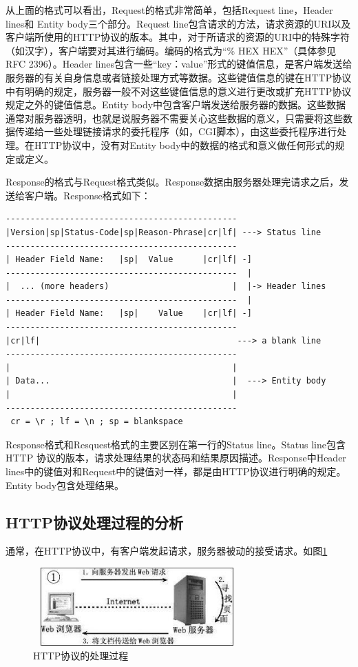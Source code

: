 \documentclass[12pt, twoside, a4paper, xetex]{report}
\begin{document}
 	从上面的格式可以看出，Request的格式非常简单，包括Request line，Header lines和 Entity body三个部分。Request line包含请求的方法，请求资源的URI以及客户端所使用的HTTP协议的版本。其中，对于所请求的资源的URI中的特殊字符（如汉字），客户端要对其进行编码。编码的格式为“\% HEX HEX”（具体参见RFC 2396）。Header lines包含一些“key：value”形式的键值信息，是客户端发送给服务器的有关自身信息或者链接处理方式等数据。这些键值信息的键在HTTP协议中有明确的规定，服务器一般不对这些键值信息的意义进行更改或扩充HTTP协议规定之外的键值信息。Entity body中包含客户端发送给服务器的数据。这些数据通常对服务器透明，也就是说服务器不需要关心这些数据的意义，只需要将这些数据传递给一些处理链接请求的委托程序（如，CGI脚本），由这些委托程序进行处理。在HTTP协议中，没有对Entity body中的数据的格式和意义做任何形式的规定或定义。
 	
 	Response的格式与Request格式类似。Response数据由服务器处理完请求之后，发送给客户端。Response格式如下：
\begin{verbatim}
-----------------------------------------------
|Version|sp|Status-Code|sp|Reason-Phrase|cr|lf| ---> Status line
-----------------------------------------------
| Header Field Name:   |sp|  Value      |cr|lf| -]
-----------------------------------------------  |
|  ... (more headers)                         |  |-> Header lines
-----------------------------------------------  |
| Header Field Name:   |sp|    Value    |cr|lf| -]
-----------------------------------------------
|cr|lf|                                        ---> a blank line
-----------------------------------------------
|                                             |
| Data...                                     |  ---> Entity body
|                                             |
-----------------------------------------------
 cr = \r ; lf = \n ; sp = blankspace
\end{verbatim}

 	Response格式和Resquest格式的主要区别在第一行的Status line。Status line包含HTTP 协议的版本，请求处理结果的状态码和结果原因描述。Response中Header lines中的键值对和Request中的键值对一样，都是由HTTP协议进行明确的规定。Entity body包含处理结果。
 	
\subsection{HTTP协议处理过程的分析}
	通常，在HTTP协议中，有客户端发起请求，服务器被动的接受请求。如图\ref{httpbaike}
	\begin{figure}[htbp]
	\centering
	\caption{HTTP协议的处理过程}
	\label{httpbaike}
	\includegraphics[height=3cm, width=8cm]{pics/httpbaike.eps}
	\end{figure}
	
\end{document}
